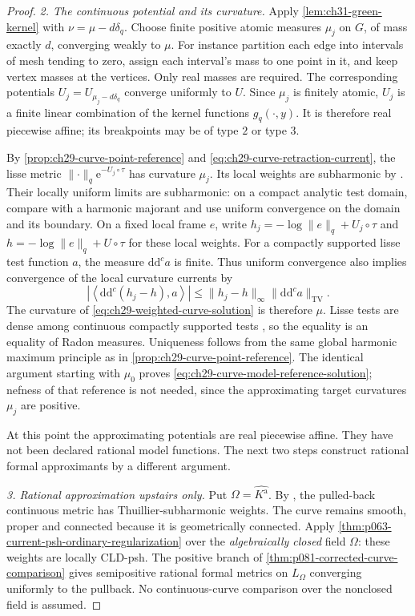 \begin{proof}
\emph{2. The continuous potential and its curvature.}
Apply \cref{lem:ch31-green-kernel} with
\(\nu=\mu-d\delta_q\).  Choose finite positive atomic measures
\(\mu_j\) on \(G\), of mass exactly \(d\), converging weakly to
\(\mu\).  For instance partition each edge into intervals of mesh
tending to zero, assign each interval's mass to one point in it, and
keep vertex masses at the vertices.  Only real masses are required.
The corresponding potentials \(U_j=U_{\mu_j-d\delta_q}\) converge
uniformly to \(U\).  Since \(\mu_j\) is finitely atomic, \(U_j\) is
a finite linear combination of the kernel functions \(g_q(\cdot,y)\).
It is therefore real piecewise affine; its breakpoints may be of
type \(2\) or type \(3\).

By \cref{prop:ch29-curve-point-reference} and \eqref{eq:ch29-curve-retraction-current},
the lisse metric
\(\lVert\cdot\rVert_q\mathrm e^{-U_j\circ\tau}\) has curvature
\(\mu_j\).  Its local weights are subharmonic by
\cite[Theorem~3.4.12(ii)]{Thu05}.  Their locally uniform limits are
subharmonic: on a compact analytic test domain, compare with a harmonic
majorant and use uniform convergence on the domain and its boundary.
On a fixed local frame \(e\), write
\(h_j=-\log\lVert e\rVert_q+U_j\circ\tau\) and
\(h=-\log\lVert e\rVert_q+U\circ\tau\) for these local weights.
For a compactly supported lisse test function \(a\), the measure
\(\mathrm d\mathrm d^ca\) is finite.  Thus uniform convergence
also implies convergence of the local curvature currents by
\[
 \left|\left\langle\mathrm d\mathrm d^c(h_j-h),a\right\rangle\right|
       \leq\lVert h_j-h\rVert_\infty
                         \lVert\mathrm d\mathrm d^ca\rVert_{\mathrm{TV}}.
\]
The curvature of \eqref{eq:ch29-weighted-curve-solution} is therefore
\(\mu\).  Lisse tests are dense among continuous compactly supported
tests \cite[Proposition~3.2.7]{Thu05}, so the equality is an equality
of Radon measures.  Uniqueness follows from the same global harmonic
maximum principle as in \cref{prop:ch29-curve-point-reference}.
The identical argument starting with \(\mu_0\) proves
\eqref{eq:ch29-curve-model-reference-solution}; nefness of that
reference is not needed, since the approximating target curvatures
\(\mu_j\) are positive.

At this point the approximating potentials are real piecewise affine.
They have not been declared rational model functions.  The next two
steps construct rational formal approximants by a different argument.

\emph{3. Rational approximation upstairs only.}
Put \(\Omega=\widehat{K^{\mathrm a}}\).  By
\cite[Corollary~3.4.5]{Thu05}, the pulled-back continuous metric has
Thuillier-subharmonic weights.  The curve remains smooth, proper and
connected because it is geometrically connected.  Apply \cref{thm:p063-current-psh-ordinary-regularization} over the
\emph{algebraically closed} field \(\Omega\): these weights are locally
CLD-psh.  The positive branch of \cref{thm:p081-corrected-curve-comparison} gives semipositive rational
formal metrics on \(L_\Omega\) converging uniformly to the pullback.
No continuous-curve comparison over the nonclosed field is assumed.


\end{proof}
